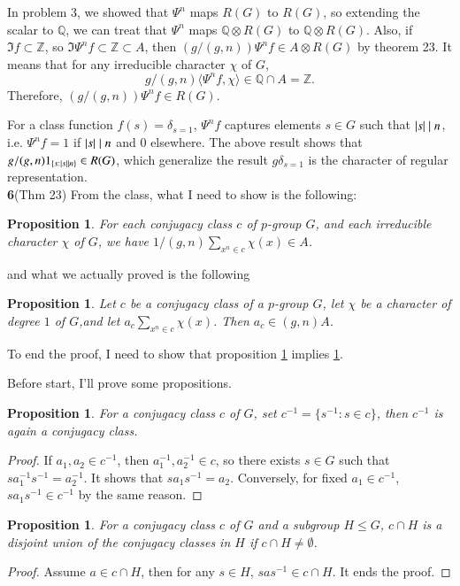\documentclass[a4paper, 12pt]{article}
\theoremstyle{Mydefinition}
\theoremstyle{Mytheorem}
\newtheorem{proposition}[statement]{Proposition}
\begin{document}
In problem 3, we showed that $\Psi^n$ maps $R(G)$ to $R(G)$, so extending the scalar to $\mathbb{Q}$, we can treat that $\Psi^n$ maps $\mathbb{Q}\otimes R(G)$ to $\mathbb{Q}\otimes R(G)$. Also, if $\Im f\subset\mathbb{Z}$, so $\Im\Psi^nf\subset \mathbb{Z}\subset A$, then $(g/(g,n))\Psi^nf\in A\otimes R(G)$ by theorem 23. It means that for any irreducible character $\chi$ of $G$,
\begin{equation}
    g/(g,n)\langle \Psi^n f, \chi\rangle \in\mathbb{Q}\cap A = \mathbb{Z}.
\end{equation}
Therefore, $(g/(g,n))\Psi^nf\in R(G)$. 

For a class function $f(s) = \delta_{s=1}$, $\Psi^n f$ captures elements $s\in G$ such that $\abs{s}\mid n$, i.e. $\Psi^n f = 1$ if $\abs{s}\mid n$ and $0$ elsewhere. The above result shows that $g/(g,n)1_{\{s:\abs{s}\mid n\}}\in R(G)$, which generalize the result $g \delta_{s=1}$ is the character of regular representation.\\

\noindent \textbf{6}(Thm 23)
From the class, what I need to show is the following:
\begin{proposition}\label{HW10:Prop:3}
For each conjugacy class $c$ of $p$-group $G$, and each irreducible character $\chi$ of $G$, we have $1/(g,n)\sum_{x^n\in c}\chi(x)\in A$.
\end{proposition}
and what we actually proved is the following
\begin{proposition}\label{HW10:Prop:4}
Let $c$ be a conjugacy class of a $p$-group $G$, let $\chi$ be a character of degree $1$ of $G$,and let $a_c\sum_{x^n\in c}\chi(x)$. Then $a_c\in (g,n)A$.
\end{proposition}
To end the proof, I need to show that proposition \ref{HW10:Prop:4} implies \ref{HW10:Prop:3}.

Before start, I'll prove some propositions.
\begin{proposition}
For a conjugacy class $c$ of $G$, set $c^{-1} = \{s^{-1}:s\in c\}$, then $c^{-1}$ is again a conjugacy class.
\end{proposition}
\begin{proof}
If $a_1,a_2\in c^{-1}$, then $a_1^{-1},a_2^{-1}\in c$, so there exists $s\in G$ such that $sa_1^{-1}s^{-1} =a_2^{-1}$. It shows that $sa_1s^{-1}=a_2$. Conversely, for fixed $a_1\in c^{-1}$, $sa_1s^{-1}\in c^{-1}$ by the same reason.
\end{proof}
\begin{proposition}\label{HW10:Prop:5}
For a conjugacy class $c$ of $G$ and a subgroup $H\leq G$, $c\cap H$ is a disjoint union of the conjugacy classes in $H$ if $c\cap H\neq \emptyset$.
\end{proposition}
\begin{proof}
Assume $a\in c\cap H$, then for any $s\in H$, $sas^{-1}\in c\cap H$. It ends the proof.
\end{proof}
\end{document}
